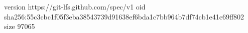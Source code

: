 version https://git-lfs.github.com/spec/v1
oid sha256:55c3cbc1f05f3eba38543739d91638ef6bda1c7bb964b7df74cb1e41c69ff802
size 97065
